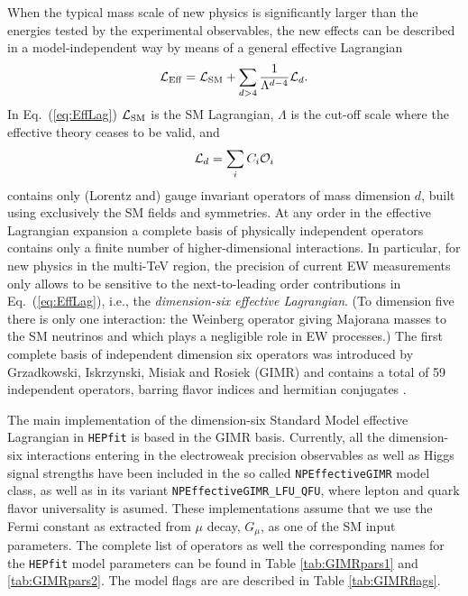 \documentclass[preprint,3p,12pt]{elsarticle}
\begin{document}
When the typical mass scale of new physics is significantly larger than the energies tested by the experimental observables, the new effects can be described in a model-independent way by means of a general effective Lagrangian
%
\begin{equation}
{\cal L}_{\mathrm{Eff}}={\cal L}_{\mathrm{SM}} + \sum_{d>4} \frac{1}{\Lambda^{d-4}}{\cal L}_d.
\label{eq:EffLag}
\end{equation}
%
In Eq.~(\ref{eq:EffLag}) ${\cal L}_{\mathrm{SM}}$ is the SM Lagrangian, $\Lambda$ is the cut-off scale where the effective theory ceases to be valid, and
%
\begin{equation}
{\cal L}_d=\sum_i C_i {\cal O}_i
\end{equation}
%
contains only (Lorentz and) gauge invariant operators of mass dimension $d$, built using exclusively the SM fields and symmetries. At any order in the effective Lagrangian expansion a complete basis of physically independent operators contains only a finite number of higher-dimensional interactions. In particular, for new physics in the multi-TeV region, the precision of current EW measurements only allows to be sensitive to the next-to-leading order contributions in  Eq.~(\ref{eq:EffLag}), i.e., the {\it dimension-six effective Lagrangian}. (To dimension five there is only one interaction: the Weinberg operator giving Majorana masses to the SM neutrinos and which plays a negligible role in EW processes.)
The first complete basis of independent dimension six operators was introduced by Grzadkowski, Iskrzynski, Misiak and Rosiek (GIMR) and contains a total of 59 independent operators, barring flavor indices and hermitian conjugates \cite{Grzadkowski:2010es}.

The main implementation of the dimension-six Standard Model effective Lagrangian in {\tt HEPfit} is based in the GIMR basis. Currently, all the dimension-six interactions entering in the electroweak precision observables as well as Higgs signal strengths have been included in the so called {\tt NPEffectiveGIMR} model class, as well as in its variant {\tt NPEffectiveGIMR\_LFU\_QFU}, where lepton and quark flavor universality is asumed. These implementations assume that we use the Fermi constant as extracted from $\mu$ decay, $G_\mu$, as one of the SM input parameters. The complete list of operators as well the corresponding names for the {\tt HEPfit} model parameters can be found in Table \ref{tab:GIMRpars1} and \ref{tab:GIMRpars2}. The model flags are are described in Table \ref{tab:GIMRflags}.
\end{document}
